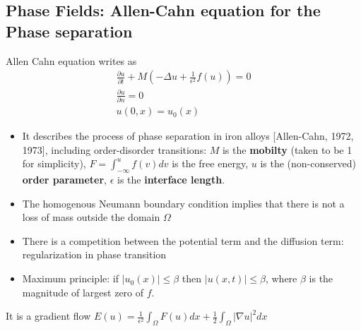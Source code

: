 \documentclass[hyperref={pdfpagemode=FullScreen},9pt]{beamer}
\newcommand{\Frac}[2] {\frac{\textstyle #1} {\textstyle #2}}
\begin{document}
 \subsection{Phase Fields: Allen-Cahn equation for the Phase separation}
 \begin{frame}
Allen Cahn equation writes as
\begin{eqnarray}
\Frac{\partial u}{\partial t} +M(-\Delta u +\Frac{1}{\epsilon^2}f(u))=0\\
\Frac{\partial u}{\partial n}=0\\
u(0,x)=u_0(x)
\end{eqnarray}
\begin{itemize}
\item It describes the process of phase separation in iron alloys [Allen-Cahn, 1972, 1973], including order-disorder transitions: 
$M$ is the {\bf mobilty} (taken to be 1 for simplicity),
$F=\displaystyle{\int_{-\infty}^u f(v)dv}$ is the free energy, $u$ is the (non-conserved) {\bf order parameter}, $\epsilon$ is the {\bf interface length}.
\item The homogenous Neumann boundary condition implies that there is not a loss of mass outside the domain $\Omega$
\item There is a competition between the  potential term and the diffusion term: regularization in phase transition
\item Maximum principle: if $|u_0(x)|\le \beta$ then $|u(x,t)|\le \beta$, where $\beta$ is the magnitude of largest zero of $f$.
\end{itemize}
It is a gradient flow $E(u)=\frac{1}{\epsilon^2}\int_{\Omega} F(u)dx +\frac{1}{2}\int_{\Omega} |\nabla u|^2dx$
\end{frame}
\end{document}
